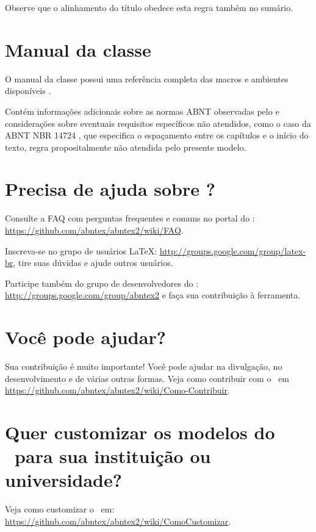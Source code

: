 Observe que o alinhamento do título obedece esta regra também no sumário.
	

\section{Manual da classe \textsf{\abnTeX}}

O manual da classe \textsf{\abnTeX} possui uma referência completa das macros e ambientes disponíveis \cite{abnetxclasse}.

Contém informações adicionais sobre as normas ABNT
observadas pelo \textsf{\abnTeX} e considerações sobre eventuais requisitos específicos
não atendidos, como o caso da ABNT NBR 14724 \cite{nbr14724}, que
especifica o espaçamento entre os capítulos e o início do texto, regra
propositalmente não atendida pelo presente modelo.

\section{Precisa de ajuda sobre \textsf{\abnTeX}?}

Consulte a FAQ com perguntas frequentes e comuns no portal do \textsf{\abnTeX}:
\url{https://github.com/abntex/abntex2/wiki/FAQ}.

Inscreva-se no grupo de usuários \LaTeX:
\url{http://groups.google.com/group/latex-br}, tire suas dúvidas e ajude
outros usuários.

Participe também do grupo de desenvolvedores do \textsf{\abnTeX}:
\url{http://groups.google.com/group/abntex2} e faça sua contribuição à
ferramenta.

\section{Você pode ajudar?}

Sua contribuição é muito importante! Você pode ajudar na divulgação, no
desenvolvimento e de várias outras formas. Veja como contribuir com o \abnTeX\
em \url{https://github.com/abntex/abntex2/wiki/Como-Contribuir}.

\section{Quer customizar os modelos do \abnTeX\ para sua instituição ou
universidade?}

Veja como customizar o \abnTeX\ em:
\url{https://github.com/abntex/abntex2/wiki/ComoCustomizar}.

